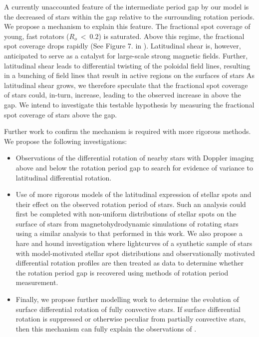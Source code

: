 A currently unaccounted feature of the intermediate period gap by our model is the decreased \rper{} of stars within the gap relative to the surrounding rotation periods.
We propose a mechanism to explain this feature.
The fractional spot coverage of young, fast rotators ($R_o \ < \ 0.2$) is saturated.
Above this regime, the fractional spot coverage drops rapidly (See Figure 7. in \citet{cao_starspots_2022}).
Latitudinal shear is, however, anticipated to serve as a catalyst for large-scale strong magnetic fields.
Further, latitudinal shear leads to differential twisting of the poloidal field lines, resulting in a bunching of field lines that result in active regions on the surfaces of stars \citep[see, e.g.,][]{berdyugina_starspots_2005, miesch_large-scale_2005, magnetism_brun_2017}
As latitudinal shear grows, we therefore speculate that the fractional spot coverage of stars could, in-turn, increase, leading to the observed increase in \rper{} above the gap.
We intend to investigate this testable hypothesis by measuring the fractional spot coverage of stars above the gap.

Further work to confirm the mechanism is required with more rigorous methods.
We propose the following investigations:
\begin{itemize}
	\item Observations of the differential rotation of nearby stars with Doppler imaging above and below the rotation period gap to search for evidence of variance to latitudinal differential rotation.
	\item Use of more rigorous models of the latitudinal expression of stellar spots and their effect on the observed rotation period of stars. Such an analysis could first be completed with non-uniform distributions of stellar spots on the surface of stars from magnetohydrodynamic simulations of rotating stars using a similar analysis to that performed in this work. We also propose a hare and hound investigation where lightcurves of a synthetic sample of stars with model-motivated stellar spot distributions and observationally motivated differential rotation profiles are then treated as data to determine whether the rotation period gap is recovered using methods of rotation period measurement.
	\item Finally, we propose further modelling work to determine the evolution of surface differential rotation of fully convective stars. If surface differential rotation is suppressed or otherwise peculiar from partially convective stars, then this mechanism can fully explain the observations of \citet{lu_bridging_2022}.
\end{itemize}

